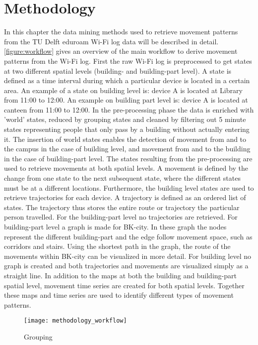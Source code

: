\chapter{Methodology}\label{Methodology}
In this chapter the data mining methods used to retrieve movement patterns from the TU Delft eduroam Wi-Fi log data will be described in detail. \autoref{figure:workflow} gives an overview of the main workflow to derive movement patterns from the Wi-Fi log. First the raw Wi-Fi log is preprocessed to get states at two different spatial levels (building- and building-part level). A state is defined as a time interval during which a particular device is located in a certain area. An example of a state on building level is: device A is located at Library from 11:00 to 12:00. An example on building part level is: device A is located at canteen from 11:00 to 12:00. In the pre-processing phase the data is enriched with 'world' states, reduced by grouping states and cleaned by filtering out 5 minute states representing people that only pass by a building without actually entering it. The insertion of world states enables the detection of movement from and to the campus in the case of building level, and movement from and to the building in the case of building-part level. The states resulting from the pre-processing are used to retrieve movements at both spatial levels. A movement is defined by the change from one state to the next subsequent state, where the different states must be at a different locations. Furthermore, the building level states are used to retrieve trajectories for each device. A trajectory is defined as an ordered list of states. The trajectory thus stores the entire route or trajectory the particular person travelled. For the building-part level no trajectories are retrieved. For building-part level a graph is made for BK-city. In these graph the nodes represent the different building-part and the edge follow movement space, such as corridors and stairs. Using the shortest path in the graph, the route of the movements within BK-city can be visualized in more detail. For building level no graph is created and both trajectories and movements are visualized simply as a straight line. In addition to the maps at both the building and building-part spatial level, movement time series are created for both spatial levels. Together these maps and time series are used to identify different types of movement patterns. 
\\
\begin{figure}[H]
\centering
\texttt{[image: methodology\_workflow]}
\captionsetup{justification=centering}
\caption{Grouping}
\label{figure:workflow}
\end{figure}
